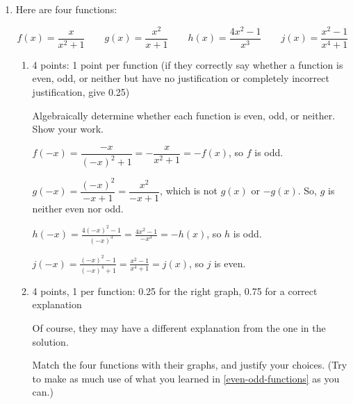 \documentclass{article}
\begin{document}
\begin{enumerate}
\begin{enumerate}
  \end{enumerate}

\item 

  Here are four functions:

  \[ f(x) = \frac{x}{x^2 + 1} \qquad g(x) = \frac{x^2}{x + 1} \qquad h(x) =
    \frac{4 x^2 - 1}{x^3} \qquad j(x) = \frac{x^2 - 1}{x^4 + 1} \]

  \begin{enumerate}
  \item \label{even-odd-functions} 

    \begin{grading}
      4 points: 1 point per function (if they correctly say whether a function is even, odd, or neither but have no justification or completely incorrect justification, give 0.25)
    \end{grading}

    \begin{problem}[\vfill]
      Algebraically determine whether each function is even, odd, or
      neither. Show your work.
    \end{problem}

    \begin{solution} 
    
      $f(-x) = \dfrac{-x}{(-x)^2 + 1} = - \dfrac{x}{x^2 + 1} = - f(x)$, so $f$ is odd.

      $g(-x) = \dfrac{(-x)^2}{-x + 1} = \dfrac{x^2}{-x + 1}$, which is not $g(x)$ or $-g(x)$. So, $g$ is neither even nor odd.

      $\displaystyle h(-x)= \frac{4(-x)^2-1}{(-x)^3} = \frac{4x^2-1}{-x^3} = -h(x)$, so $h$ is odd.

      $\displaystyle j(-x) = \frac{(-x)^2-1}{(-x)^4+1}= \frac{x^2-1}{x^4+1} = j(x)$, so $j$ is even.
    \end{solution} 

  \item

    \begin{grading}
      4 points, 1 per function: 0.25 for the right graph, 0.75 for a correct explanation

      Of course, they may have a different explanation from the one in the solution.
    \end{grading}

    \begin{problem}
      Match the four functions with their graphs, and justify your choices. (Try to make as much use of what you learned in \ref{even-odd-functions} as you can.)
    \end{problem}


\end{enumerate}
\end{enumerate}
\end{document}

